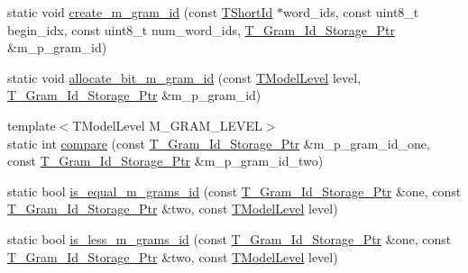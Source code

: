 \begin{DoxyCompactItemize}
\item 
static void \hyperlink{structuva_1_1smt_1_1tries_1_1mgrams_1_1_bit___m___gram___id_ab4f41c2b53aa07c2a112c70c6d9b5643}{create\+\_\+m\+\_\+gram\+\_\+id} (const \hyperlink{namespaceuva_1_1smt_1_1hashing_adcf22e1982ad09d3a63494c006267469}{T\+Short\+Id} $\ast$word\+\_\+ids, const uint8\+\_\+t begin\+\_\+idx, const uint8\+\_\+t num\+\_\+word\+\_\+ids, \hyperlink{namespaceuva_1_1smt_1_1tries_1_1mgrams_1_1_m___gram___id_a478e6468dbd5dab37599c566d77c845c}{T\+\_\+\+Gram\+\_\+\+Id\+\_\+\+Storage\+\_\+\+Ptr} \&m\+\_\+p\+\_\+gram\+\_\+id)
\item 
static void \hyperlink{structuva_1_1smt_1_1tries_1_1mgrams_1_1_bit___m___gram___id_a4a369d73d7d212b8ba5257d9a79cc753}{allocate\+\_\+bit\+\_\+m\+\_\+gram\+\_\+id} (const \hyperlink{namespaceuva_1_1smt_1_1tries_a20577a44b3a42d26524250634379b7cb}{T\+Model\+Level} level, \hyperlink{namespaceuva_1_1smt_1_1tries_1_1mgrams_1_1_m___gram___id_a478e6468dbd5dab37599c566d77c845c}{T\+\_\+\+Gram\+\_\+\+Id\+\_\+\+Storage\+\_\+\+Ptr} \&m\+\_\+p\+\_\+gram\+\_\+id)
\item 
{\footnotesize template$<$T\+Model\+Level M\+\_\+\+G\+R\+A\+M\+\_\+\+L\+E\+V\+E\+L$>$ }\\static int \hyperlink{structuva_1_1smt_1_1tries_1_1mgrams_1_1_bit___m___gram___id_a8492744c56e58df966de1d72959d101f}{compare} (const \hyperlink{namespaceuva_1_1smt_1_1tries_1_1mgrams_1_1_m___gram___id_a478e6468dbd5dab37599c566d77c845c}{T\+\_\+\+Gram\+\_\+\+Id\+\_\+\+Storage\+\_\+\+Ptr} \&m\+\_\+p\+\_\+gram\+\_\+id\+\_\+one, const \hyperlink{namespaceuva_1_1smt_1_1tries_1_1mgrams_1_1_m___gram___id_a478e6468dbd5dab37599c566d77c845c}{T\+\_\+\+Gram\+\_\+\+Id\+\_\+\+Storage\+\_\+\+Ptr} \&m\+\_\+p\+\_\+gram\+\_\+id\+\_\+two)
\item 
static bool \hyperlink{structuva_1_1smt_1_1tries_1_1mgrams_1_1_bit___m___gram___id_a094f37502680fbebcfd4262e8bbe01db}{is\+\_\+equal\+\_\+m\+\_\+grams\+\_\+id} (const \hyperlink{namespaceuva_1_1smt_1_1tries_1_1mgrams_1_1_m___gram___id_a478e6468dbd5dab37599c566d77c845c}{T\+\_\+\+Gram\+\_\+\+Id\+\_\+\+Storage\+\_\+\+Ptr} \&one, const \hyperlink{namespaceuva_1_1smt_1_1tries_1_1mgrams_1_1_m___gram___id_a478e6468dbd5dab37599c566d77c845c}{T\+\_\+\+Gram\+\_\+\+Id\+\_\+\+Storage\+\_\+\+Ptr} \&two, const \hyperlink{namespaceuva_1_1smt_1_1tries_a20577a44b3a42d26524250634379b7cb}{T\+Model\+Level} level)
\item 
static bool \hyperlink{structuva_1_1smt_1_1tries_1_1mgrams_1_1_bit___m___gram___id_ac2688a13b8a7f84e2cb3358486db3c15}{is\+\_\+less\+\_\+m\+\_\+grams\+\_\+id} (const \hyperlink{namespaceuva_1_1smt_1_1tries_1_1mgrams_1_1_m___gram___id_a478e6468dbd5dab37599c566d77c845c}{T\+\_\+\+Gram\+\_\+\+Id\+\_\+\+Storage\+\_\+\+Ptr} \&one, const \hyperlink{namespaceuva_1_1smt_1_1tries_1_1mgrams_1_1_m___gram___id_a478e6468dbd5dab37599c566d77c845c}{T\+\_\+\+Gram\+\_\+\+Id\+\_\+\+Storage\+\_\+\+Ptr} \&two, const \hyperlink{namespaceuva_1_1smt_1_1tries_a20577a44b3a42d26524250634379b7cb}{T\+Model\+Level} level)

\end{DoxyCompactItemize}
